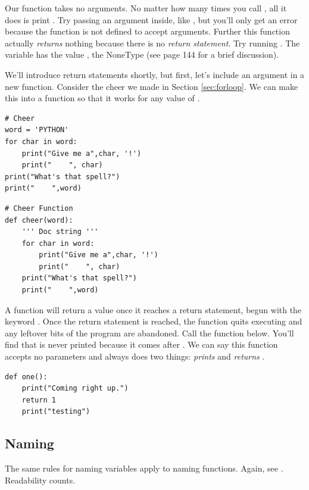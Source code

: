 Our function  takes no arguments. No matter how many times you call , all it does is print . Try passing an argument inside, like , but you'll only get an error because the function is not defined to accept arguments. Further this function actually \emph{returns} nothing because there is no \emph{return statement}. Try running . The variable  has the value , the NoneType (see \cite{lubanovic2019introducing} page 144 for a brief discussion). 


We'll introduce return statements shortly, but first, let's include an argument in a new function. Consider the cheer we made in Section \ref{sec:forloop}. We can make this into a function so that it works for any value of .

\begin{lstlisting}
# Cheer
word = 'PYTHON'
for char in word:
    print("Give me a",char, '!')
    print("    ", char)
print("What's that spell?")
print("    ",word) \end{lstlisting}

\begin{lstlisting}
# Cheer Function
def cheer(word):
    ''' Doc string '''
    for char in word:
        print("Give me a",char, '!')
        print("    ", char)
    print("What's that spell?")
    print("    ",word) \end{lstlisting}
    
    
 A function will return a value once it reaches a return statement, begun with the keyword . Once the return statement is reached, the function quits executing and any leftover bits of the program are abandoned. Call the function  below. You'll find that  is never printed because it comes after . We can say this function accepts no parameters and always does two things: \emph{prints}  and \emph{returns} .
 
\begin{lstlisting}
def one():
    print("Coming right up.")
    return 1
    print("testing")
\end{lstlisting}


\subsection{Naming}

The same rules for naming variables apply to naming functions. Again, see . Readability counts. 

